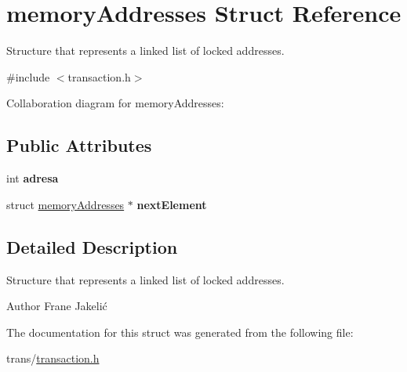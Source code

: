 \hypertarget{structmemoryAddresses}{\section{memory\+Addresses Struct Reference}
\label{structmemoryAddresses}
}


Structure that represents a linked list of locked addresses.  




{\ttfamily \#include $<$transaction.\+h$>$}



Collaboration diagram for memory\+Addresses\+:
\subsection*{Public Attributes}
\begin{DoxyCompactItemize}
\item 
\hypertarget{structmemoryAddresses_aec25a7082201140bdc5e4047d2280f5a}{int {\bfseries adresa}}\label{structmemoryAddresses_aec25a7082201140bdc5e4047d2280f5a}

\item 
\hypertarget{structmemoryAddresses_a3500fd65745a7c7df644c3ac4efcff6c}{struct \hyperlink{structmemoryAddresses}{memory\+Addresses} $\ast$ {\bfseries next\+Element}}\label{structmemoryAddresses_a3500fd65745a7c7df644c3ac4efcff6c}

\end{DoxyCompactItemize}


\subsection{Detailed Description}
Structure that represents a linked list of locked addresses. 

\begin{DoxyAuthor}{Author}
Frane Jakelić 
\end{DoxyAuthor}


The documentation for this struct was generated from the following file\+:\begin{DoxyCompactItemize}
\item 
trans/\hyperlink{transaction_8h}{transaction.\+h}\end{DoxyCompactItemize}
